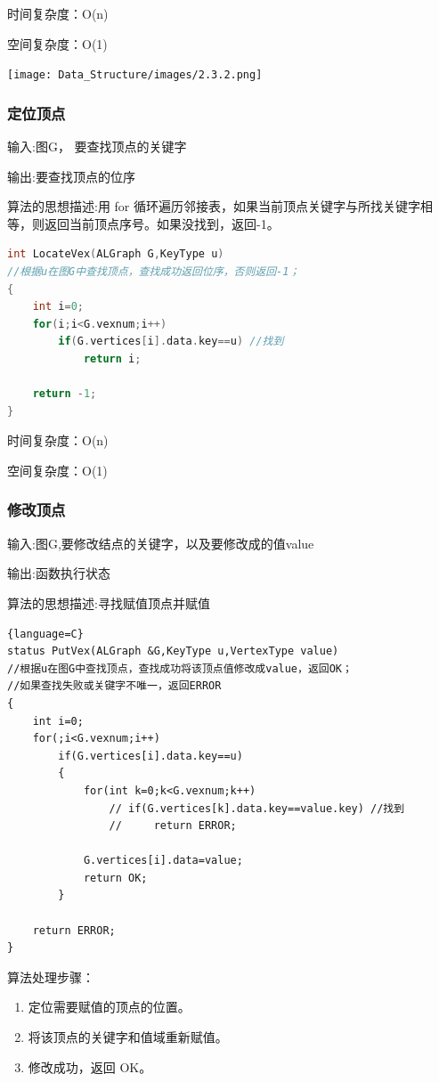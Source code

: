 \documentclass[supercite]{Experimental_Report}
\theoremstyle{definition}
\begin{document}
时间复杂度：O(n)

空间复杂度：O(1)

\texttt{[image: Data\_Structure/images/2.3.2.png]}
\vspace{-0.2cm}
\subsubsection{定位顶点}
输入:图G， 要查找顶点的关键字

输出:要查找顶点的位序

算法的思想描述:用 for 循环遍历邻接表，如果当前顶点关键字与所找关键字相等，则返回当前顶点序号。如果没找到，返回-1。
\begin{lstlisting}[language=C] 	
int LocateVex(ALGraph G,KeyType u)
//根据u在图G中查找顶点，查找成功返回位序，否则返回-1；
{
    int i=0;
    for(i;i<G.vexnum;i++)
        if(G.vertices[i].data.key==u) //找到
            return i;
    
    return -1;
}
\end{lstlisting}

时间复杂度：O(n)

空间复杂度：O(1)
\subsubsection{修改顶点}
输入:图G,要修改结点的关键字，以及要修改成的值value

输出:函数执行状态

算法的思想描述:寻找赋值顶点并赋值
\begin{lstlisting}{language=C}
status PutVex(ALGraph &G,KeyType u,VertexType value)
//根据u在图G中查找顶点，查找成功将该顶点值修改成value，返回OK；
//如果查找失败或关键字不唯一，返回ERROR
{
    int i=0;
    for(;i<G.vexnum;i++)
        if(G.vertices[i].data.key==u) 
        {
            for(int k=0;k<G.vexnum;k++)
                // if(G.vertices[k].data.key==value.key) //找到
                //     return ERROR;
            
            G.vertices[i].data=value;  
            return OK;
        }
    
    return ERROR;  
}
\end{lstlisting}
算法处理步骤：
\begin{enumerate}
	\renewcommand{\labelenumi}{\theenumi)}
	\item 定位需要赋值的顶点的位置。
	\item 将该顶点的关键字和值域重新赋值。
	\item 修改成功，返回 OK。
\end{enumerate}
\end{document}

